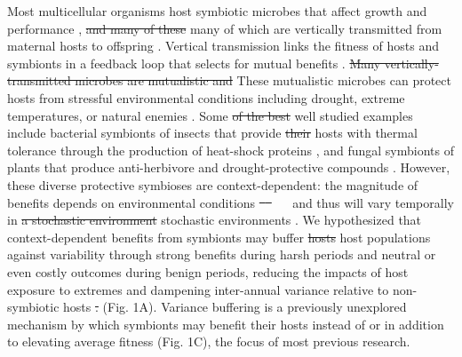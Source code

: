 \documentclass[lineno,sn-nature]{sn-jnl}%
\providecommand{\DIFadd}[1]{{\protect\color{blue}#1}} %
\providecommand{\DIFdel}[1]{{\protect\color{red}\protect\scriptsize\sout{#1}}}
\providecommand{\DIFadd}[1]{{\protect\color{blue}\uwave{#1}}} %
\providecommand{\DIFdel}[1]{{\protect\color{red}\sout{#1}}}                      %
\providecommand{\DIFaddbegin}{} %
\providecommand{\DIFaddend}{} %
\providecommand{\DIFdelbegin}{} %
\providecommand{\DIFdelend}{} %
\newcommand{\DIFscaledelfig}{0.5}
\newlength{\DIFdelgraphicswidth} %
\newlength{\DIFdelgraphicsheight} %
\newcommand{\DIFaddincludegraphics}[2][]{{\color{blue}\fbox{\DIFOincludegraphics[#1]{#2}}}} %
\newcommand{\DIFdelincludegraphics}[2][]{%
\sbox{\DIFdelgraphicsbox}{\DIFOincludegraphics[#1]{#2}}%
\settoboxwidth{\DIFdelgraphicswidth}{\DIFdelgraphicsbox} %
\settoboxtotalheight{\DIFdelgraphicsheight}{\DIFdelgraphicsbox} %
\scalebox{\DIFscaledelfig}{%
\parbox[b]{\DIFdelgraphicswidth}{\usebox{\DIFdelgraphicsbox}\\[-\baselineskip] \rule{\DIFdelgraphicswidth}{0em}}\llap{\resizebox{\DIFdelgraphicswidth}{\DIFdelgraphicsheight}{%
\setlength{\unitlength}{\DIFdelgraphicswidth}%
\begin{picture}(1,1)%
\thicklines\linethickness{2pt} %
{\color[rgb]{1,0,0}\put(0,0){\framebox(1,1){}}}%
{\color[rgb]{1,0,0}\put(0,0){\line( 1,1){1}}}%
{\color[rgb]{1,0,0}\put(0,1){\line(1,-1){1}}}%
\end{picture}%
}\hspace*{3pt}}} %
} %
\DeclareRobustCommand{\DIFaddbegin}{\DIFOaddbegin \let\includegraphics\DIFaddincludegraphics} %
\DeclareRobustCommand{\DIFaddend}{\DIFOaddend \let\includegraphics\DIFOincludegraphics} %
\DeclareRobustCommand{\DIFdelbegin}{\DIFOdelbegin \let\includegraphics\DIFdelincludegraphics} %
\DeclareRobustCommand{\DIFdelend}{\DIFOaddend \let\includegraphics\DIFOincludegraphics} %
\begin{document}
Most multicellular organisms host symbiotic microbes that affect growth and performance \cite{rodriguez2009fungal,mcfall2013animals}, \DIFdelbegin \DIFdel{and many of these }\DIFdelend \DIFaddbegin \DIFadd{many of which }\DIFaddend are vertically transmitted from maternal hosts to offspring \cite{funkhouser2013mom}.
Vertical transmission links the fitness of hosts and symbionts in a feedback loop that selects for mutual benefits \cite{fine1975vectors}.
\DIFdelbegin \DIFdel{Many vertically-transmitted microbes are mutualistic and }\DIFdelend \DIFaddbegin \DIFadd{These mutualistic microbes can }\DIFaddend protect hosts from stressful environmental conditions including drought, extreme temperatures, or natural enemies \cite{russell2006costs, kivlin2013fungal}. 
Some \DIFdelbegin \DIFdel{of the best }\DIFdelend \DIFaddbegin \DIFadd{well }\DIFaddend studied examples include bacterial symbionts of insects that provide \DIFdelbegin \DIFdel{their }\DIFdelend hosts with thermal tolerance through the production of heat-shock proteins \cite{dunbar2007aphid}, and fungal symbionts of plants that produce anti-herbivore and drought-protective compounds \cite{reyna2012detection,saikkonen2013chemical,neyaz2022localization}.
However, these diverse protective symbioses are context-dependent: the magnitude of benefits depends on environmental conditions \DIFdelbegin \DIFdel{\mbox{%
\cite{chamberlain2014context} }\hspace{0pt}%
}\DIFdelend \DIFaddbegin \DIFadd{\mbox{%
\cite{chamberlain2014context,catford2022addressing} }\hspace{0pt}%
}\DIFaddend and thus will vary temporally in \DIFdelbegin \DIFdel{a stochastic environment }\DIFdelend \DIFaddbegin \DIFadd{stochastic environments }\DIFaddend \cite{jordano1994spatial}. 
We hypothesized that context-dependent benefits from symbionts may buffer \DIFdelbegin \DIFdel{hosts }\DIFdelend \DIFaddbegin \DIFadd{host populations }\DIFaddend against variability through strong benefits during harsh periods and neutral or even costly outcomes during benign periods, reducing the impacts of host exposure to extremes and dampening inter-annual variance relative to non-symbiotic hosts \DIFdelbegin \DIFdel{.
}\DIFdelend \DIFaddbegin \DIFadd{(Fig. 1A).
}\DIFaddend Variance buffering is a previously unexplored mechanism by which symbionts may benefit their hosts instead of or in addition to elevating average fitness \DIFaddbegin \DIFadd{(Fig. 1C)}\DIFaddend , the focus of most previous research. 
\end{document}
